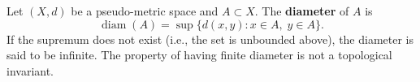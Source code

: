 Let $(X,d)$ be a pseudo-metric space and $A \subset X$. The \textbf{diameter} of $A$ is
$$\operatorname{diam}(A) = \sup \{d(x,y) : x \in A,\; y \in A\}.$$
If the supremum does not exist (i.e., the set is unbounded above), the diameter is said to be infinite. The property of having finite diameter is not a topological invariant.
